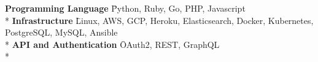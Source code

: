 
\begin{cvparagraph}

  \begin{nospacetabbing}
  \textbf{Programming Language}  \= Python, Ruby, Go, PHP, Javascript\\*
  \textbf{Infrastructure}  \= Linux, AWS, GCP, Heroku, Elasticsearch, Docker, Kubernetes, PostgreSQL, MySQL, Ansible\\*
  \textbf{API and Authentication}  \= OAuth2, REST, GraphQL\\*
  \end{nospacetabbing}

\end{cvparagraph}
